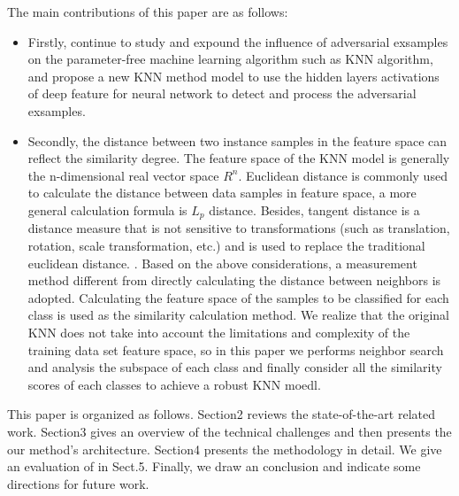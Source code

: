 \documentclass{ieeeaccess}
\begin{document}
	The main contributions of this paper are as follows: 
\begin{itemize}
	\item 
	Firstly, continue to study and expound the influence of adversarial exsamples on the parameter-free machine learning algorithm such as KNN algorithm, and propose a new KNN method model to use the hidden layers activations of deep feature for neural network to detect and process the adversarial exsamples.
	\item 
	Secondly, the distance between two instance samples in the feature space can reflect the similarity degree. The feature space of the KNN model is generally the n-dimensional real vector space $R^n$. Euclidean distance is commonly used to calculate the distance between data samples in feature space, a more general calculation formula is $L_{p}$ distance. Besides, tangent distance is a distance measure that is not sensitive to transformations (such as translation, rotation, scale transformation, etc.) and is used to replace the traditional euclidean distance. \cite{simard1998transformation}. Based on the above considerations, a measurement method different from directly calculating the distance between neighbors is adopted. Calculating the feature space of the samples to be classified for each class is used as the similarity calculation method. We realize that the original KNN does not take into account the limitations and complexity of the training data set feature space, so in this paper we performs neighbor search and analysis the subspace of each class and finally consider all the similarity scores of each classes to achieve a robust KNN moedl. 
\end{itemize}


This paper is organized as follows. Section2 reviews the state-of-the-art related work. Section3 gives an overview of the technical challenges and then presents the our method's architecture. Section4 presents the methodology in detail. We give an evaluation of in Sect.5. Finally, we draw an conclusion and indicate some directions for future work.
\end{document}
